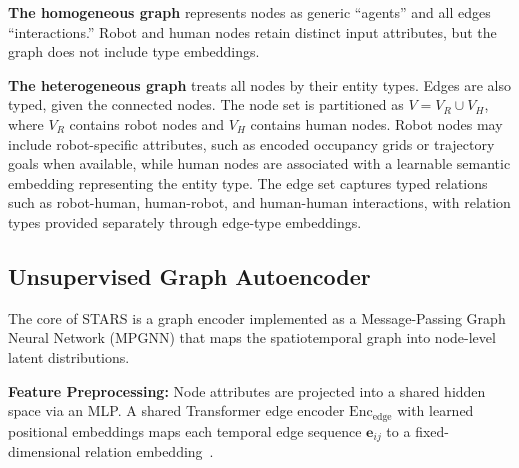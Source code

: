 \documentclass{article}
\newcommand{\method}{STARS\xspace}
\begin{document}
\textbf{The homogeneous graph} represents nodes as generic ``agents'' and all edges ``interactions.''
Robot and human nodes retain distinct input attributes, but the graph does not include type embeddings.

\textbf{The heterogeneous graph}
treats all nodes by their entity types.
Edges are also typed, given the connected nodes.
The node set is partitioned as $V = V_R \cup V_H$, where $V_R$ contains robot nodes and $V_H$ contains human nodes.
Robot nodes may include robot-specific attributes, such as encoded occupancy grids or trajectory goals when available, while human nodes are associated with a learnable semantic embedding representing the entity type.
The edge set captures typed relations such as robot-human, human-robot, and human-human interactions, with relation types provided separately through edge-type embeddings.

\subsection{Unsupervised Graph Autoencoder}

The core of \method is a graph encoder implemented as a Message-Passing Graph Neural Network (MPGNN) that maps the spatiotemporal graph into node-level latent distributions.

\textbf{Feature Preprocessing:}
Node attributes are projected into a shared hidden space via an MLP.
A shared Transformer edge encoder $\text{Enc}_{\text{edge}}$ with learned positional embeddings maps each temporal edge sequence $\mathbf{e}_{ij}$ to a fixed-dimensional relation embedding~\cite{vaswani2017attention,devlin2019bert}.
\end{document}
